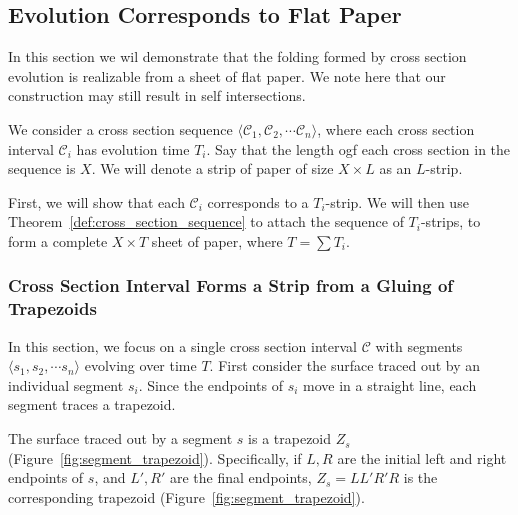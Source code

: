 \subsection{Evolution Corresponds to Flat Paper}
\label{sec:flat}

In this section we wil demonstrate that the folding formed by cross section evolution is realizable from a sheet of flat paper.
We note here that our construction may still result in self intersections.

We consider a cross section sequence $\langle \mathcal C_1, \mathcal C_2,\cdots \mathcal C_n \rangle$,
where each cross section interval $\mathcal C_i$ has evolution time $T_i$.
Say that the length ogf each cross section in the sequence is $X$.
We will denote a strip of paper of size $X\times L$ as an $L$-strip.

First, we will show that each $\mathcal C_i$ corresponds to a $T_i$-strip.
We will then use Theorem~\ref{def:cross_section_sequence} to attach the sequence of $T_i$-strips,
to form a complete $X\times T$ sheet of paper, where $T = \sum T_i$.

\subsubsection{Cross Section Interval Forms a Strip from a Gluing of Trapezoids}
\label{sec:cross_section_interval_strip}

In this section, we focus on a single cross section interval $\mathcal C$ with segments $\langle s_1, s_2,\cdots s_n \rangle$ evolving over time $T$.
First consider the surface traced out by an individual segment $s_i$.
Since the endpoints of $s_i$ move in a straight line, each segment traces  a trapezoid.

\begin{figure}[htb]
\graphicspath{{./figures/}}
    \centering
    \hspace{-9em}
    \caption{}
    \label{fig:trapezoid}
\end{figure}

\begin{definition}
\label{def:trapezoid}
The surface traced out by a segment $s$ is a trapezoid $Z_s$ (Figure~\ref{fig:segment_trapezoid}).
Specifically, if $L,R$ are the initial left and right endpoints of $s$, and $L',R'$ are the final endpoints,
$Z_s = LL'R'R$ is the corresponding trapezoid (Figure~\ref{fig:segment_trapezoid}).
\end{definition}

